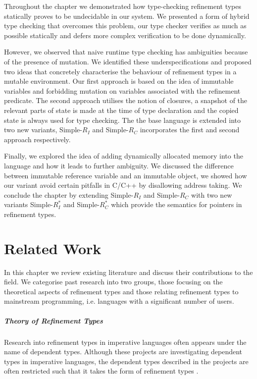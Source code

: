 \documentclass[a4paper,12pt]{report}
\begin{document}
\par
Throughout the chapter we demonstrated how type-checking refinement types 
statically proves to be undecidable in our system. 
We presented a form of hybrid type checking 
that overcomes this problem, our type checker verifies as much as possible 
statically and defers more complex verification to be done dynamically. 

\par
However, we observed that naive runtime type checking has ambiguities 
because of the presence of mutation. We identified these underspecifications and 
proposed two ideas that concretely characterise the behaviour of refinement 
types in a mutable environment. Our first approach is based on the 
idea of immutable variables and forbidding mutation on variables associated 
with the refinement predicate. The second approach utilises the notion of closures, 
a snapshot of the relevant parts of state is made at the time of type declaration and the copied 
state is always used for type checking. The the base language is extended into two 
new variants, Simple-$R_{I}$ and Simple-$R_{C}$ incorporates the first 
and second approach respectively.

\par
Finally, we explored the idea of adding dynamically allocated memory into the 
language and how it leads to further ambiguity. We discussed the 
difference between immutable reference variable and an immutable object, we 
showed how our variant avoid certain pitfalls in C/C++ by disallowing 
address taking. We conclude the chapter by extending Simple-$R_{I}$ 
and Simple-$R_{C}$ with two new variants Simple-$R^{*}_{I}$ and Simple-$R^{*}_{C}$ 
which provide the semantics for pointers in refinement types. 

\chapter{Related Work} \label{chapter:related_work}
In this chapter we review existing literature and discuss their  
contributions to the field. We categorise past research into two  
groups, those focusing on the theoretical aspects of refinement types 
and those relating refinement types to mainstream programming, i.e. languages 
with a significant number of users. 

\paragraph{Theory of Refinement Types} Research into 
refinement types in imperative languages often appears under the name of 
dependent types. Although these projects are investigating dependent types 
in imperative languages, the dependent types described in the projects are 
often restricted such that it takes the form of refinement types 
\cite{objOritentedDependentType, dynamicInDep}. 
\end{document}
